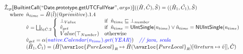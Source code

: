 \[\begin{array}{l}
\aI _{cp}\lbr \SF{BuiltintCall}(``\SF{Date.prototype.getUTCFullYear}",args_{})\rbr((\hat{H},\hat{C}), \hat{S})
  = ((\hat{H}_1, \hat{C_1}), \hat{S})\\
\quad\wherec{
  \hat{n}_{time} = \hat{H}(\hat{l})(\avarprop{primitive}).1.4\\
  \hat{v} = \bigsqcup_{\hat{l} \in \hat{C}.2} \left\{\begin{array}{ll}
      \bot_{Value} & \ifc{\hat{n}_{time} \sqsubseteq  \bot_{number}}\\
      \hat{v}_{get} &
      \ifc{\hat{n}_{time} = \SF{UIntSingle}(n_{time}) \lor\hat{n}_{time} = \SF{NUIntSingle}(n_{time}) }\\
      Value(\top_{Number}) & \owc
    \end{array}\right.\\
  \hat{v}_{get} = \alpha({\inblue native.Calendar(n_{time}).get(\emph{YEAR})})
    \quad\comment{{\inblue // java, scala}}\\  
  (\hat{H}_1, \hat{C}_1) = 
    (\hat{H}[\avarloc{PureLocal}_R \mapsto \hat{H}(\avarloc{PureLocal}_R)
      [\varprop{return} \mapsto \hat{v}]], \hat{C})\\
  }\\
\\\\
\end{array}
\]


